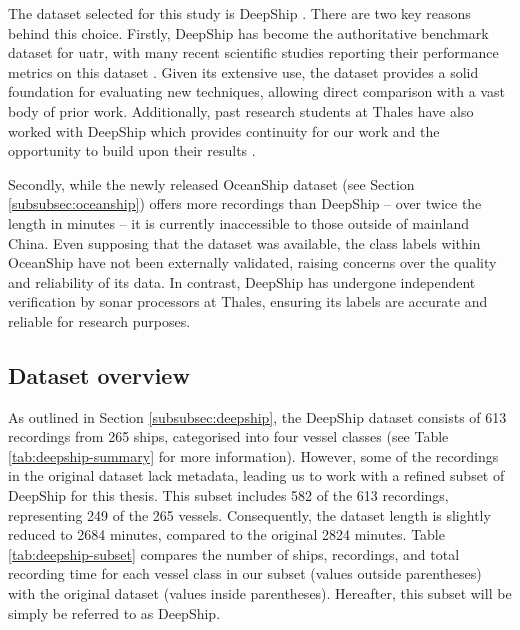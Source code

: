 The dataset selected for this study is DeepShip \cite{irfan_deepship_2021}. There are two key reasons behind this choice. Firstly, DeepShip has become the authoritative benchmark dataset for \acrshort{uatr}, with many recent scientific studies reporting their performance metrics on this dataset \cite{yao_underwater_2024-1, yao_underwater_2024, yan_lightweight_2024, xu_self-supervised_2024, tang_deep_2024, chen_ship-radiated_2024, chen_hierarchical_2024, ahmad_deep_2024, yao_underwater_2023, xu_self-supervised_2023, tian_joint_2023, sun_underwater_2023, li_underwater_2022}. Given its extensive use, the dataset provides a solid foundation for evaluating new techniques, allowing direct comparison with a vast body of prior work. Additionally, past research students at Thales have also worked with DeepShip which provides continuity for our work and the opportunity to build upon their results \cite{cheng_deep_2024}.

Secondly, while the newly released OceanShip dataset (see Section \ref{subsubsec:oceanship}) offers more recordings than DeepShip -- over twice the length in minutes -- it is currently inaccessible to those outside of mainland China. Even supposing that the dataset was available, the class labels within OceanShip have not been externally validated, raising concerns over the quality and reliability of its data. In contrast, DeepShip has undergone independent verification by sonar processors at Thales, ensuring its labels are accurate and reliable for research purposes.

\subsection{Dataset overview}

As outlined in Section \ref{subsubsec:deepship}, the DeepShip dataset consists of 613 recordings from 265 ships, categorised into four vessel classes (see Table \ref{tab:deepship-summary} for more information). However, some of the recordings in the original dataset lack metadata, leading us to work with a refined subset of DeepShip for this thesis. This subset includes 582 of the 613 recordings, representing 249 of the 265 vessels. Consequently, the dataset length is slightly reduced to 2684 minutes, compared to the original 2824 minutes. Table \ref{tab:deepship-subset} compares the number of ships, recordings, and total recording time for each vessel class in our subset (values outside parentheses) with the original dataset (values inside parentheses). Hereafter, this subset will be simply be referred to as DeepShip.

